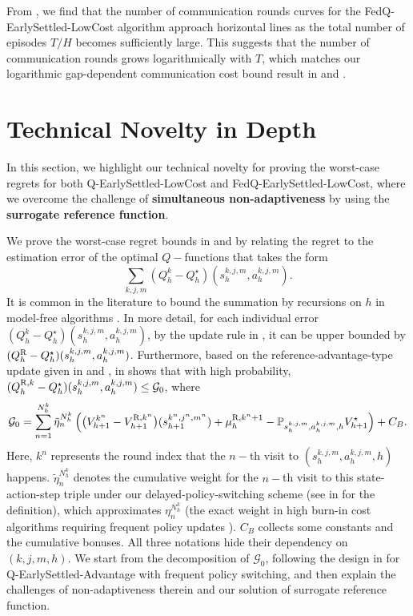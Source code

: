 \documentclass{article}
\newcommand{\R}{\textnormal{R}}
\begin{document}
From , we find that the number of communication rounds curves for the FedQ-EarlySettled-LowCost algorithm approach horizontal lines as the total number of episodes $T/H$ becomes sufficiently large. This suggests that the number of communication rounds grows logarithmically with $T$, which matches our logarithmic gap-dependent communication cost bound result in  and .

\section{Technical Novelty in Depth}
\label{novelty}
In this section, we highlight our technical novelty for proving the worst-case regrets for both Q-EarlySettled-LowCost and FedQ-EarlySettled-LowCost, where we overcome the challenge of \textbf{simultaneous non-adaptiveness} by using the \textbf{surrogate reference function}.

We prove the worst-case regret bounds in  and  by relating the regret to the estimation error of the optimal $Q-$functions that takes the form $$\sum_{k,j,m}(Q_h^k-Q_h^\star)(s_h^{k,j,m},a_h^{k,j,m}).$$ It is common in the literature to bound the summation by recursions on $h$ in model-free algorithms \cite{li2023breaking,yang2021q,zhang2020almost,zheng2023federated}. In more detail, for each individual error $(Q_h^k-Q_h^\star)(s_h^{k,j,m},a_h^{k,j,m})$, by the update rule in , it can be upper bounded by $(Q_h^{\R}-Q_h^\star)(s_h^{k,j,m},a_h^{k,j,m})$. Furthermore, based on the reference-advantage-type update given in  and ,  in  shows that with high probability, $(Q_h^{\R,k} - Q_h^{\star})(s_h^{k,j,m}, a_h^{k,j,m})\leq \mathcal{G}_0$, where
$$\mathcal{G}_0 = \sum_{n=1}^{N_h^k} \Tilde{\eta}_n^{N_h^k} \left( \big(V_{h+1}^{k^n}-V_{h+1}^{\R,k^n}\big)(s_{h+1}^{k^n,j^n,m^n})   + \mu_h^{\R,k^n+1}- \mathbb{P}_{s_h^{k,j,m}, a_h^{k,j,m},h}V_{h+1}^{\star}\right) + C_{B}.$$
Here, $k^n$ represents the round index that the $n-$th visit to $(s_h^{k,j,m},a_h^{k,j,m},h)$ happens. $\tilde{\eta}_n^{N_h^k}$ denotes the cumulative weight for the $n-$th visit to this state-action-step triple under our delayed-policy-switching scheme (see  in  for the definition), which approximates $\eta_n^{N_h^k}$ (the exact weight in high burn-in cost algorithms requiring frequent policy updates \cite{jin2018q, li2023breaking}). $C_B$ collects some constants and the cumulative bonuses. All three notations hide their dependency on $(k,j,m,h)$. We start from the decomposition of $\mathcal{G}_0$, following the design in \cite{li2023breaking} for Q-EarlySettled-Advantage with frequent policy switching, and then explain the challenges of non-adaptiveness therein and our solution of surrogate reference function. 
\end{document}
